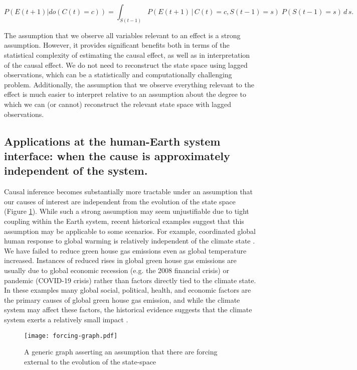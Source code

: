 \documentclass[12pt]{article}
\begin{document}
\begin{equation}
  P(E(t+1)| do(C(t)=c)) = \int_{S(t-1)} P(E(t+1) \, | \, C(t)=c,
  S(t-1) = s
  )\; P(S(t-1)=s) \, d \, s.
\end{equation}

The assumption that we observe all variables relevant to an effect is
a strong assumption. However, it provides significant benefits both in
terms of the statistical complexity of estimating the causal effect,
as well as in interpretation of the causal effect. We do not need to
reconstruct the state space  using lagged observations, which can be a
statistically and computationally challenging problem. Additionally,
the assumption that we observe everything relevant to the effect is
much easier to interpret relative to an assumption about the degree to
which we can (or cannot) reconstruct the relevant state space with
lagged observations.

\subsection{Applications at the human-Earth system interface: when the
  cause is approximately independent of the system.}
\label{human}

Causal inference becomes substantially more tractable under an
assumption that our causes of interest are independent from the
evolution of the state space (Figure \ref{fig:forcing}). While such a
strong assumption may seem unjustifiable due to tight coupling within
the Earth system, recent historical examples suggest that this
assumption may be applicable to some scenarios. For example,
coordinated global human response to global warming is relatively
independent of the climate state \citep{arto2014drivers}. We have
failed to reduce green house gas emissions even as global temperature
increased. Instances of reduced rises in global green house gas
emissions are usually due to global economic recession (e.g. the 2008
financial crisis) or pandemic (COVID-19 crisis) rather than factors
directly tied to the climate state. In these examples many global
social, political, health, and economic factors are the primary causes
of global green house gas emission, and while the climate system may
affect these factors, the historical evidence suggests that the
climate system exerts a relatively small impact
\citep{arto2014drivers}.

\begin{figure}
  \texttt{[image: forcing-graph.pdf]}
  \caption{A generic graph asserting an assumption that there are
    forcing external to the evolution of the state-space}
  \label{fig:forcing}
\end{figure}
\end{document}

